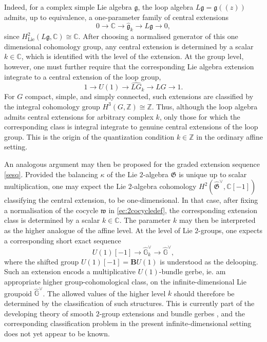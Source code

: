 \documentclass[11pt]{amsart}
\newcommand{\C}{{\mathbb C}}
\numberwithin{equation}{section}
\numberwithin{figure}{section}
\numberwithin{table}{section}
\theoremstyle{thm}
\numberwithin{equation}{subsection}
\theoremstyle{definition}
\theoremstyle{rem}
\begin{document}
Indeed, for a complex simple Lie algebra $\mathfrak g$, the loop algebra $L\mathfrak g=\mathfrak g(\!(z)\!)$ admits, up to equivalence, a one-parameter family of central extensions
\begin{equation}
    0 \longrightarrow \mathbb C \longrightarrow \widehat{\mathfrak g}_{k} \longrightarrow L\mathfrak g \longrightarrow 0,
\end{equation}
since $H^2_{\mathrm{Lie}}(L\mathfrak g,\mathbb C)\cong \mathbb C$. After choosing a normalised generator of this one dimensional cohomology group, any central extension is determined by a scalar 
$k\in \C$, which is identified with the level of the extension. At the group level, however, one must further require that the corresponding Lie algebra extension integrate to a central extension of the loop group,
\begin{equation}
    1 \longrightarrow U(1) \longrightarrow \widehat{LG}_{k} \longrightarrow LG \longrightarrow 1.
\end{equation}
For $G$ compact, simple, and simply connected, such extensions are classified by the integral cohomology group
$H^3(G,\mathbb Z)\cong \mathbb Z$. Thus, although the loop algebra admits central extensions for arbitrary complex $k$, only those for which the corresponding class is integral integrate to genuine central extensions of the loop group. This is the origin of the quantization condition $k\in\mathbb Z$ in the ordinary affine setting.

An analogous argument may then be proposed for the graded extension sequence \eqref{sesq}. Provided the balancing $\kappa$ of the Lie $2$-algebra $\mathfrak G$ is unique up to scalar multiplication, one may expect the Lie $2$-algebra cohomology $H^2(\widehat{\mathfrak G}^{\vee},\mathbb C[-1])$ classifying the central extension, to be one-dimensional. In that case, after fixing a normalisation of the cocycle $\mathfrak w$ in \eqref{ec:2cocycledef}, the corresponding extension class is determined by a scalar $k\in\mathbb C$. The parameter $k$ may then be interpreted as the higher analogue of the affine level.
At the level of Lie $2$-groups, one expects a corresponding short exact sequence
\begin{equation}
\label{ec:groupextension}
    U(1)[-1]\to \widehat{\mathbb G}^{\vee}_{k}\to \widehat{\mathbb G}^{\vee},
\end{equation}
where the shifted group $U(1)[-1]=\mathbf B U(1)$ is understood as the delooping. Such an extension encods a multiplicative $U(1)$-bundle gerbe, ie. am appropriate higher group-cohomological class, on the infinite-dimensional Lie groupoid $\widehat{\mathbb G}^{\vee}$. The allowed values of the higher level $k$ should therefore be determined by the classification of such structures. This is currently part of the developing theory of smooth $2$-group extensions and bundle gerbes \cite{Ludewig:2023,Schommer_Pries_2011,Bunk:2020rju}, and the corresponding classification problem in the present infinite-dimensional setting does not yet appear to be known.
\end{document}
